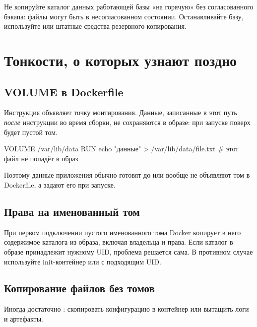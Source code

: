 \begin{warnbox}
Не копируйте каталог данных работающей базы «на горячую» без
согласованного бэкапа: файлы могут быть в несогласованном состоянии.
Останавливайте базу, используйте  или штатные средства
резервного копирования.
\end{warnbox}

\section{Тонкости, о которых узнают поздно}

\subsection{VOLUME в Dockerfile}

Инструкция  объявляет точку монтирования. Данные,
записанные в этот путь \emph{после} инструкции во время сборки,
не сохраняются в образе: при запуске поверх будет пустой том.

\begin{code}[language=dockerfile]
VOLUME /var/lib/data
RUN echo "данные" > /var/lib/data/file.txt   # этот файл не попадёт в образ
\end{code}

Поэтому данные приложения обычно готовят до  или вообще
не объявляют том в Dockerfile, а задают его при запуске.

\subsection{Права на именованный том}

При первом подключении пустого именованного тома Docker копирует
в него содержимое каталога из образа, включая владельца и права.
Если каталог в образе принадлежит нужному UID, проблема решается
сама. В противном случае используйте init-контейнер или
 с подходящим UID.


\subsection{Копирование файлов без томов}

Иногда достаточно : скопировать конфигурацию в контейнер
или вытащить логи и артефакты.

